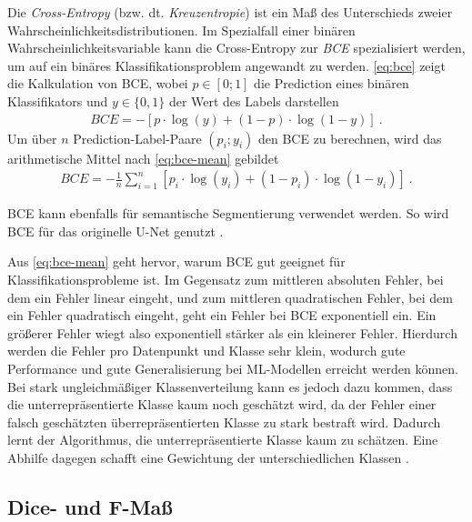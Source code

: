 Die \textit{Cross-Entropy} (bzw. dt. \textit{Kreuzentropie}) ist ein Maß des Unterschieds zweier
Wahrscheinlichkeitsdistributionen. Im Spezialfall einer binären Wahrscheinlichkeitsvariable 
kann die Cross-Entropy zur \textit{\acf{BCE}} spezialisiert werden, um auf ein binäres 
Klassifikationsproblem angewandt zu werden. 
\autoref{eq:bce} zeigt die Kalkulation von \ac{BCE}, wobei $p \in [0;1]$ die Prediction 
eines binären Klassifikators und $y \in \{0,1\}$ der Wert des Labels darstellen
\begin{align}
	\label{eq:bce} BCE = -[p \cdot \log(y) + (1-p) \cdot \log(1-y) ]~.
\end{align} 
Um über $n$ Prediction-Label-Paare $(p_i; y_i)$ den \ac{BCE} zu berechnen, wird das arithmetische Mittel nach
\autoref{eq:bce-mean} gebildet \cites{Cybenko.1999}{Murphy.2012}
\begin{align}
	\label{eq:bce-mean} BCE = -\frac{1}{n}\sum_{i = 1}^{n}[p_i \cdot \log(y_i) + (1-p_i) \cdot \log(1-y_i) ]~.
\end{align}

\acf{BCE} kann ebenfalls für semantische Segmentierung verwendet werden. So wird \acf{BCE} 
für das originelle U-Net genutzt \cite{Ronneberger.18052015}. 

Aus \autoref{eq:bce-mean} geht hervor, warum \ac{BCE} gut geeignet für Klassifikationsprobleme ist.
Im Gegensatz zum mittleren absoluten Fehler, bei dem ein Fehler linear eingeht, und zum mittleren quadratischen Fehler,
bei dem ein Fehler quadratisch eingeht, geht ein Fehler bei \ac{BCE} exponentiell ein. 
Ein größerer Fehler wiegt also exponentiell stärker als ein kleinerer Fehler. 
Hierdurch werden die Fehler pro Datenpunkt und Klasse sehr klein, 
wodurch gute Performance und gute Generalisierung bei \ac{ML}-Modellen erreicht werden können. \\

Bei stark ungleichmäßiger Klassenverteilung kann es jedoch dazu kommen, 
dass die unterrepräsentierte Klasse kaum noch geschätzt wird, 
da der Fehler einer falsch geschätzten überrepräsentierten Klasse zu stark bestraft wird.
Dadurch lernt der Algorithmus, die unterrepräsentierte Klasse kaum zu schätzen.
Eine Abhilfe dagegen schafft eine Gewichtung der unterschiedlichen Klassen \cite{Ronneberger.18052015}.

\subsection{Dice- und F-Maß}

